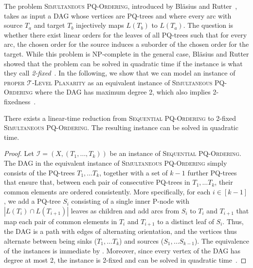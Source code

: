 \documentclass[runningheads]{llncs}
\newcommand{\pqprob}{\textsc{Sequential PQ-Or\-der\-ing}\xspace}
\newcommand{\simpq}{\textsc{Simultaneous PQ-Ordering}\xspace}
\newcommand{\tlp}{\textsc{proper $\mathcal T$-Level Planarity}\xspace}
\begin{document}
The problem \simpq, introduced by Bläsius and Rutter~\cite{br-spqoa-16}, takes as input a DAG whose vertices are PQ-trees and where every arc with source $T_a$ and target $T_b$ injectively maps $L(T_b)$ to $L(T_a)$.
The question is whether there exist linear orders for the leaves of all PQ-trees such that for every arc, the chosen order for the source induces a suborder of the chosen order for the target.
While this problem is NP-complete in the general case, Bläsius and Rutter showed that the problem can be solved in quadratic time if the instance is what they call \emph{2-fixed}~\cite{br-spqoa-16}.
In the following, we show that we can model an instance of \tlp as an equivalent instance of \simpq where the DAG has maximum degree 2, which also implies 2-fixedness~\cite{br-spqoa-16}.


\begin{theorem}\label{thm:pqrob2simpq}
  There exists a linear-time reduction from \pqprob to 2-fixed \simpq.
  The resulting instance can be solved in quadratic time.
\end{theorem}
\begin{proof}
  Let $\mathcal I = (X, (T_1, \dots, T_k))$ be an instance of \pqprob.
  The DAG in the equivalent instance of \simpq simply consists of the PQ-trees $T_1, \dots T_k$, together with a set of $k-1$ further PQ-trees that ensure that, between each pair of consecutive PQ-trees in $T_1, \dots T_k$, their common elements are ordered consistently.
  More specifically, for each $i \in [k - 1]$, we add a PQ-tree $S_i$ consisting of a single inner P-node with $|L(T_i) \cap L(T_{i+1})|$ leaves as children and add arcs from $S_i$ to $T_i$ and $T_{i+1}$ that map each pair of common elements in $T_i$ and $T_{i+1}$ to a distinct leaf of $S_i$.
  Thus, the DAG is a path with edges of alternating orientation, and the vertices thus alternate between being sinks ($T_1, \dots T_k$) and sources ($S_1, \dots S_{k-1}$).
  The equivalence of the instances is immediate by .
  Moreover, since every vertex of the DAG has degree at most 2, the instance is 2-fixed and can be solved in quadratic time~\cite{br-spqoa-16}.
\end{proof}
\end{document}
